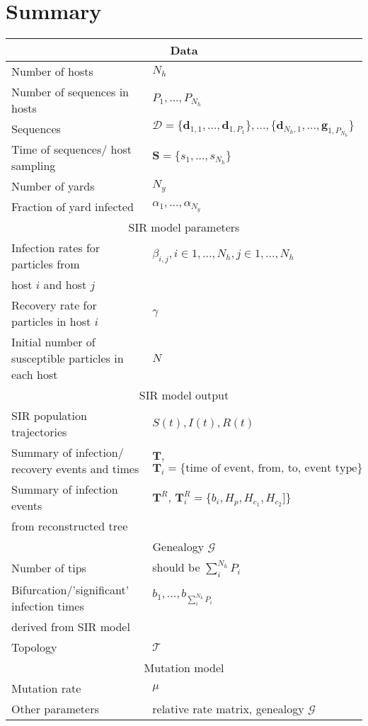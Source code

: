 \documentclass[a4paper,18pt]{report}
\begin{document}
\section{Summary}
\begin{tabular}{|l|l|}
\hline 
\multicolumn{2}{|c|}{Data}\\
\hline
Number of hosts & $N_h$  \\
Number of sequences in hosts & $P_1,...,P_{N_h}$ \\
Sequences & $\mathcal{D}=\{\mathbf{d}_{1,1},...,\mathbf{d}_{1,P_1}\},...,\{\mathbf{d}_{N_h,1},...,\mathbf{g}_{1,P_{N_h}}\} $ \\
Time of sequences/ host sampling& $\mathbf{S}=\{s_1,...,s_{N_h}\}$ \\
Number of yards & $N_y$  \\
Fraction of yard infected & $\alpha_1,...,\alpha_{N_y}$ \\
\hline 
\multicolumn{2}{|c|}{SIR model parameters}\\
\hline
Infection rates for particles from  & $\beta_{i,j}, i \in 1,...,N_h, j \in 1,...,N_h$ \\
host $i$ and host $j$ & \\
Recovery rate for particles in host $i$ & $\gamma$ \\
Initial number of susceptible particles in each host & $N$ \\
\hline 
\multicolumn{2}{|c|}{SIR model output}\\
\hline
SIR population trajectories & $S(t), I(t), R(t)$ \\
Summary of infection/ recovery events and times & $\mathbf{T}$, $\mathbf{T}_i=\{\textrm{time of event, from, to, event type} \}$ \\
Summary of infection events & $\mathbf{T}^R$, $\mathbf{T}^R_i=\{b_i, H_p,H_{c_1}, H_{c_2}] \}$ \\
from reconstructed tree & \\
\hline 
\multicolumn{2}{|c|}{Genealogy $\mathcal{G}$}\\
\hline
Number of tips & should be $\sum_i^{N_h}P_i$ \\
Bifurcation/'significant' infection times & $b_1,...,b_{\sum_i^{N_h}P_i}$ \\
derived from SIR model&  \\
Topology & $\mathcal{T} $\\
\hline
\multicolumn{2}{|c|}{Mutation model}\\
\hline
Mutation rate & $\mu$ \\
Other parameters & relative rate matrix, genealogy $\mathcal{G}$ \\
\hline
\end{tabular}


\end{document}
